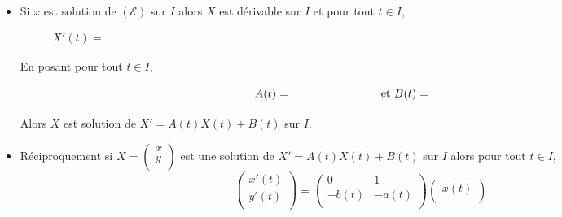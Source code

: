 \documentclass[a4paper,10pt]{report}
\begin{document}
\begin{itemize}
\item Si $x$ est solution de $(\mathcal{E})$ sur $I$ alors $X$ est dérivable sur $I$ et pour tout $t \in I$,
$$ X'(t) = \phantom{\begin{pmatrix}
x'(t) \\
x''(t) \\
\end{pmatrix} = \begin{pmatrix}
x'(t) \\
-a(t)x'(t)-b(t)x(t)+c(t) \\
\end{pmatrix} = \begin{pmatrix}
0 & 1 \\
-b(t) & - a(t) \\
\end{pmatrix} \begin{pmatrix}
x(t) \\
x'(t) \\
\end{pmatrix} + \begin{pmatrix}
0 \\
c(t)
\end{pmatrix}}$$
En posant pour tout $t \in I$,
$$ A(t) = \phantom{\begin{pmatrix}
0 & 1 \\
-b(t) & -a(t) \\
\end{pmatrix}} \; \hbox{ et } B(t) = \phantom{\begin{pmatrix}
0 \\
c(t)
\end{pmatrix}}$$
Alors $X$ est solution de $X'=A(t)X(t)+B(t)$ sur $I$.
\item Réciproquement si $X = \begin{pmatrix}
x \\
y \\
\end{pmatrix}$ est une solution de $X'=A(t)X(t)+B(t)$ sur $I$ alors pour tout $t \in I$,
$$\begin{pmatrix}
x'(t) \\
y'(t) \\
\end{pmatrix} =  \begin{pmatrix}
0 & 1 \\
-b(t) & - a(t) \\
\end{pmatrix} \begin{pmatrix}
x(t) \\

\end{pmatrix}$$
\end{itemize}
\end{document}
